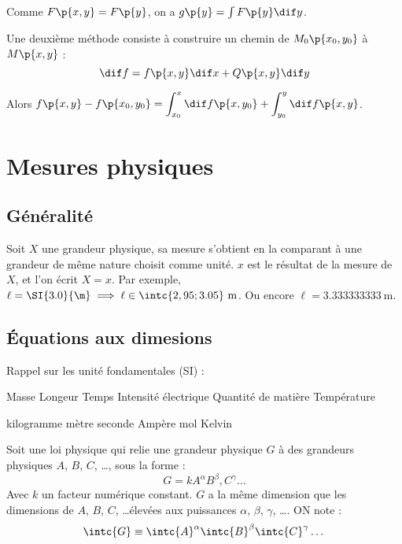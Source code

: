     Comme $F\p{x, y} = F\p{y}$, on a $g\p{y} = \int F\p{y}\dif y$.
    
    Une deuxième méthode consiste à construire un chemin de $M_0\p{x_0, y_0}$ à $M\p{x, y}$ :
    \[ \dif f = f\p{x, y}\dif x + Q\p{x, y}\dif y\]
    
    Alors $\displaystyle f\p{x, y} - f\p{x_0, y_0} = \int_{x_0}^x \dif f\p{x, y_0} + \int_{y_0}^y \dif f \p{x, y}$.
    
    \section{Mesures physiques}
    
    \subsection{Généralité}
    
    Soit $X$ une grandeur physique, sa mesure s'obtient en la comparant à une grandeur de même nature choisit comme unité. $x$ est le résultat de la mesure de $X$, et l'on écrit $X = x$. Par exemple, $\ell = \SI{3.0}{\m} \implies \ell \in \intc{2,95 ; 3.05} \ \text{m}$. Ou encore $\ell = \SI{3.333333333}{\m}$.
    
    \subsection{Équations aux dimesions}
    
    Rappel sur les unité fondamentales (SI) :
    \begin{enumerate}
        \begin{minipage}{0.45\linewidth}
            \itt Masse
            \itt Longeur
            \itt Temps
            \itt Intensité électrique
            \itt Quantité de matière
            \itt Température
        \end{minipage}
        \hfill
        \begin{minipage}{0.45\linewidth}
            \itt kilogramme
            \itt mètre
            \itt seconde
            \itt Ampère
            \itt mol
            \itt Kelvin
        \end{minipage}
    \end{enumerate}
    
    Soit une loi physique qui relie une grandeur physique $G$ à des grandeurs physiques $A$, $B$, $C$, \dots, sous la forme :
    \[ G = k A^\alpha B^\beta, C^\gamma \dots\]
    Avec $k$ un facteur numérique constant. $G$ a la même dimension que les dimensions de $A$, $B$, $C$, \dots élevées aux puissances $\alpha$, $\beta$, $\gamma$, \dots. ON note :
    \[ \intc{G} \equiv \intc{A}^\alpha \intc{B}^\beta \intc{C}^\gamma \dots\]
    
